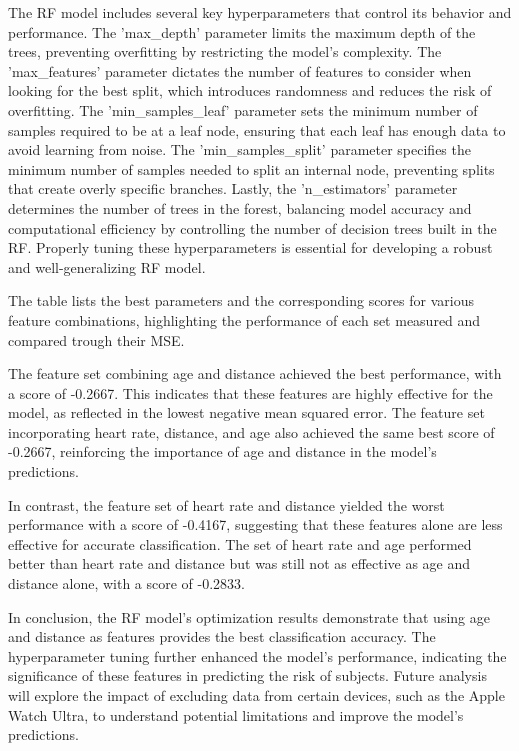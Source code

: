 The RF model includes several key hyperparameters that control its behavior and performance. The 'max\_depth' parameter limits the maximum depth of the trees, preventing overfitting by restricting the model's complexity. The 'max\_features' parameter dictates the number of features to consider when looking for the best split, which introduces randomness and reduces the risk of overfitting. The 'min\_samples\_leaf' parameter sets the minimum number of samples required to be at a leaf node, ensuring that each leaf has enough data to avoid learning from noise. The 'min\_samples\_split' parameter specifies the minimum number of samples needed to split an internal node, preventing splits that create overly specific branches. Lastly, the 'n\_estimators' parameter determines the number of trees in the forest, balancing model accuracy and computational efficiency by controlling the number of decision trees built in the RF. Properly tuning these hyperparameters is essential for developing a robust and well-generalizing RF model.

The table lists the best parameters and the corresponding scores for various feature combinations, highlighting the performance of each set measured and compared trough their MSE.

The feature set combining age and distance achieved the best performance, with a score of -0.2667. This indicates that these features are highly effective for the model, as reflected in the lowest negative mean squared error. The feature set incorporating heart rate, distance, and age also achieved the same best score of -0.2667, reinforcing the importance of age and distance in the model's predictions.

In contrast, the feature set of heart rate and distance yielded the worst performance with a score of -0.4167, suggesting that these features alone are less effective for accurate classification. The set of heart rate and age performed better than heart rate and distance but was still not as effective as age and distance alone, with a score of -0.2833.

In conclusion, the RF model's optimization results demonstrate that using age and distance as features provides the best classification accuracy. The hyperparameter tuning further enhanced the model's performance, indicating the significance of these features in predicting the risk of subjects. Future analysis will explore the impact of excluding data from certain devices, such as the Apple Watch Ultra, to understand potential limitations and improve the model's predictions.

